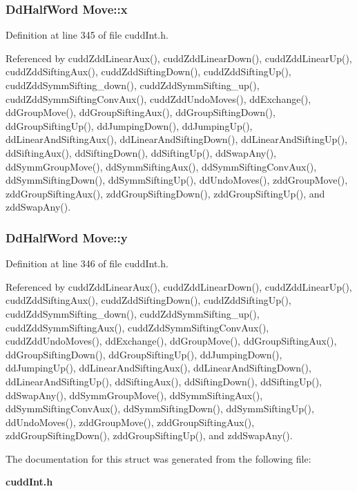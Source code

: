 \subsubsection{\setlength{\rightskip}{0pt plus 5cm}\bf{Dd\-Half\-Word} \bf{Move::x}}\label{structMove_b59271ac45831d44da990e031bfa23d0}




Definition at line 345 of file cudd\-Int.h.

Referenced by cudd\-Zdd\-Linear\-Aux(), cudd\-Zdd\-Linear\-Down(), cudd\-Zdd\-Linear\-Up(), cudd\-Zdd\-Sifting\-Aux(), cudd\-Zdd\-Sifting\-Down(), cudd\-Zdd\-Sifting\-Up(), cudd\-Zdd\-Symm\-Sifting\_\-down(), cudd\-Zdd\-Symm\-Sifting\_\-up(), cudd\-Zdd\-Symm\-Sifting\-Conv\-Aux(), cudd\-Zdd\-Undo\-Moves(), dd\-Exchange(), dd\-Group\-Move(), dd\-Group\-Sifting\-Aux(), dd\-Group\-Sifting\-Down(), dd\-Group\-Sifting\-Up(), dd\-Jumping\-Down(), dd\-Jumping\-Up(), dd\-Linear\-And\-Sifting\-Aux(), dd\-Linear\-And\-Sifting\-Down(), dd\-Linear\-And\-Sifting\-Up(), dd\-Sifting\-Aux(), dd\-Sifting\-Down(), dd\-Sifting\-Up(), dd\-Swap\-Any(), dd\-Symm\-Group\-Move(), dd\-Symm\-Sifting\-Aux(), dd\-Symm\-Sifting\-Conv\-Aux(), dd\-Symm\-Sifting\-Down(), dd\-Symm\-Sifting\-Up(), dd\-Undo\-Moves(), zdd\-Group\-Move(), zdd\-Group\-Sifting\-Aux(), zdd\-Group\-Sifting\-Down(), zdd\-Group\-Sifting\-Up(), and zdd\-Swap\-Any().
\subsubsection{\setlength{\rightskip}{0pt plus 5cm}\bf{Dd\-Half\-Word} \bf{Move::y}}\label{structMove_a9efffa2fedb329783f36f190e6c4b3b}




Definition at line 346 of file cudd\-Int.h.

Referenced by cudd\-Zdd\-Linear\-Aux(), cudd\-Zdd\-Linear\-Down(), cudd\-Zdd\-Linear\-Up(), cudd\-Zdd\-Sifting\-Aux(), cudd\-Zdd\-Sifting\-Down(), cudd\-Zdd\-Sifting\-Up(), cudd\-Zdd\-Symm\-Sifting\_\-down(), cudd\-Zdd\-Symm\-Sifting\_\-up(), cudd\-Zdd\-Symm\-Sifting\-Aux(), cudd\-Zdd\-Symm\-Sifting\-Conv\-Aux(), cudd\-Zdd\-Undo\-Moves(), dd\-Exchange(), dd\-Group\-Move(), dd\-Group\-Sifting\-Aux(), dd\-Group\-Sifting\-Down(), dd\-Group\-Sifting\-Up(), dd\-Jumping\-Down(), dd\-Jumping\-Up(), dd\-Linear\-And\-Sifting\-Aux(), dd\-Linear\-And\-Sifting\-Down(), dd\-Linear\-And\-Sifting\-Up(), dd\-Sifting\-Aux(), dd\-Sifting\-Down(), dd\-Sifting\-Up(), dd\-Swap\-Any(), dd\-Symm\-Group\-Move(), dd\-Symm\-Sifting\-Aux(), dd\-Symm\-Sifting\-Conv\-Aux(), dd\-Symm\-Sifting\-Down(), dd\-Symm\-Sifting\-Up(), dd\-Undo\-Moves(), zdd\-Group\-Move(), zdd\-Group\-Sifting\-Aux(), zdd\-Group\-Sifting\-Down(), zdd\-Group\-Sifting\-Up(), and zdd\-Swap\-Any().

The documentation for this struct was generated from the following file:\begin{CompactItemize}
\item 
\bf{cudd\-Int.h}\end{CompactItemize}
